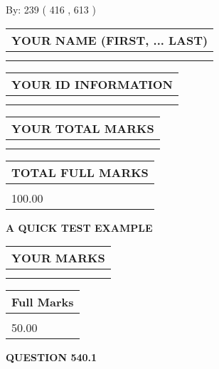 \documentclass[12pt]{article}
\begin{document}
   
\hspace{1.0in} By: 
 239 ( 416 ,  613 )
   
   
   
   
\newpage 
\setcounter{page}{ 
   540001 } 
   
   
   
   
\noindent\begin{tabular}{|l|}
\hline
YOUR NAME (FIRST, ... LAST)  \\
\hline
 \\ 
 \\ 
\hline
\end{tabular}
\hspace{0.05in} \begin{tabular}{|l|}
\hline
 YOUR   ID   INFORMATION  \\
\hline
 \\ 
 \\ 
\hline
\end{tabular}
   
   
\vspace{0.2in}\noindent\begin{tabular}{|l|}
\hline
YOUR TOTAL MARKS  \\
\hline
 \\ 
 \\ 
\hline
\end{tabular}
\hspace{0.05in} \begin{tabular}{|l|}
\hline
TOTAL FULL MARKS  \\
\hline
 \\ 
100.00 \\
\hline
\end{tabular}
   
   
 \vspace{0.2in}
{\LARGE {\textbf{ A QUICK TEST EXAMPLE}}}
   
   
  
\vspace{0.2in}
  
\noindent\begin{tabular}{|l|}
\hline
 YOUR MARKS  \\
\hline
 \\ 
 \\ 
\hline
\end{tabular}
\hspace{0.05in} \begin{tabular}{|l|}
\hline
 Full Marks  \\
\hline
 \\ 
50.00 \\
\hline
\end{tabular}
{\textbf{\Large{QUESTION
540.1 
}}}
  
\end{document}
